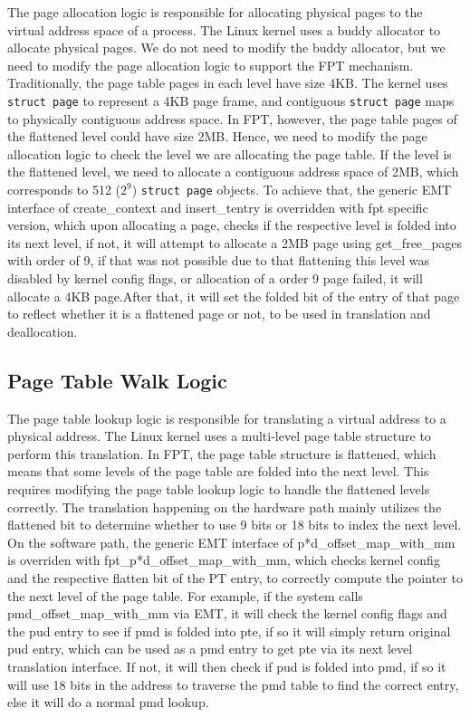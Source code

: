 The page allocation logic is responsible for allocating physical pages to the virtual address space of a process. The Linux kernel uses a buddy allocator to allocate physical pages. We do not need to modify the buddy allocator, but we need to modify the page allocation logic to support the FPT mechanism. Traditionally, the page table pages in each level have size 4KB. The kernel uses \texttt{struct page} to represent a 4KB page frame, and contiguous \texttt{struct page} maps to physically contiguous address space. In FPT, however, the page table pages of the flattened level could have size 2MB. Hence, we need to modify the page allocation logic to check the level we are allocating the page table. If the level is the flattened level, we need to allocate a contiguous address space of 2MB, which corresponds to 512 ($2^9$) \texttt{struct page} objects. To achieve that, the generic EMT interface of create_context and insert_tentry is overridden with fpt specific version, which upon allocating a page, checks if the respective level is folded into its next level, if not, it will attempt to allocate a 2MB page using get_free_pages with order of 9, if that was not possible due to that flattening this level was disabled by kernel config flags, or allocation of a order 9 page failed, it will allocate a 4KB page.After that, it will set the folded bit of the entry of that page to reflect whether it is a flattened page or not, to be used in translation and deallocation.

\subsection{Page Table Walk Logic}

The page table lookup logic is responsible for translating a virtual address to a physical address. The Linux kernel uses a multi-level page table structure to perform this translation. In FPT, the page table structure is flattened, which means that some levels of the page table are folded into the next level. This requires modifying the page table lookup logic to handle the flattened levels correctly. The translation happening on the hardware path mainly utilizes the flattened bit to determine whether to use 9 bits or 18 bits to index the next level. On the software path, the generic EMT interface of p*d_offset_map_with_mm is overriden with fpt_p*d_offset_map_with_mm, which checks kernel config and the respective flatten bit of the PT entry, to correctly compute the pointer to the next level of the page table. For example, if the system calls pmd_offset_map_with_mm via EMT, it will check the kernel config flags and the pud entry to see if pmd is folded into pte, if so it will simply return original pud entry, which can be used as a pmd entry to get pte via its next level translation interface. If not, it will then check if pud is folded into pmd, if so it will use 18 bits in the address to traverse the pmd table to find the correct entry, else it will do a normal pmd lookup.

